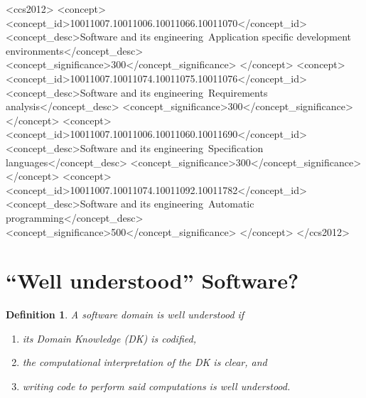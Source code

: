 \documentclass[sigconf,review]{acmart}
\begin{document}
\begin{CCSXML}
<ccs2012>
   <concept>
       <concept_id>10011007.10011006.10011066.10011070</concept_id>
       <concept_desc>Software and its engineering~Application specific development environments</concept_desc>
       <concept_significance>300</concept_significance>
       </concept>
   <concept>
       <concept_id>10011007.10011074.10011075.10011076</concept_id>
       <concept_desc>Software and its engineering~Requirements analysis</concept_desc>
       <concept_significance>300</concept_significance>
       </concept>
   <concept>
       <concept_id>10011007.10011006.10011060.10011690</concept_id>
       <concept_desc>Software and its engineering~Specification languages</concept_desc>
       <concept_significance>300</concept_significance>
       </concept>
   <concept>
       <concept_id>10011007.10011074.10011092.10011782</concept_id>
       <concept_desc>Software and its engineering~Automatic programming</concept_desc>
       <concept_significance>500</concept_significance>
       </concept>
 </ccs2012>
\end{CCSXML}



\newtheorem{defn}{Definition}

\maketitle

\section{``Well understood'' Software?}\label{ch:wellUnderstood}

\begin{defn}
A software domain is \emph{well understood} if
\begin{enumerate}
\item its Domain Knowledge (DK) is codified,
\item the computational interpretation of the DK is clear, and
\item writing code to perform said computations is well understood.
\end{enumerate}
\end{defn}
\end{document}
